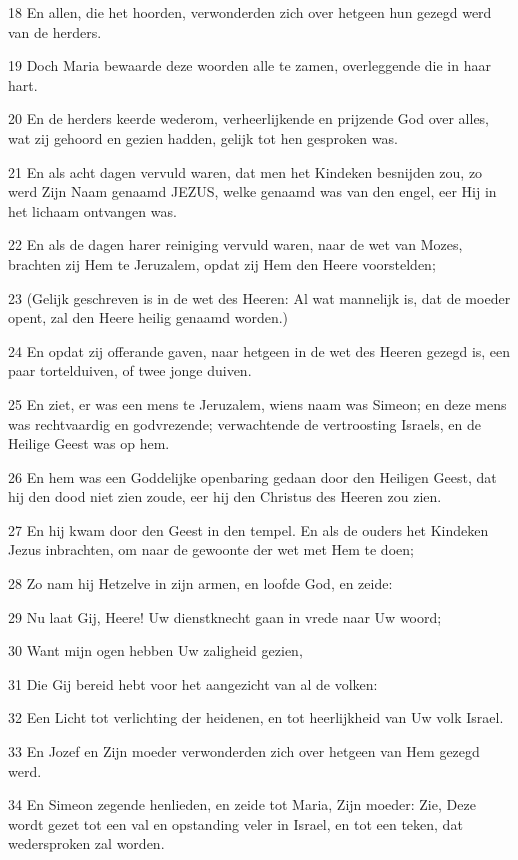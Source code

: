 \par 18 En allen, die het hoorden, verwonderden zich over hetgeen hun gezegd werd van de herders.
\par 19 Doch Maria bewaarde deze woorden alle te zamen, overleggende die in haar hart.
\par 20 En de herders keerde wederom, verheerlijkende en prijzende God over alles, wat zij gehoord en gezien hadden, gelijk tot hen gesproken was.
\par 21 En als acht dagen vervuld waren, dat men het Kindeken besnijden zou, zo werd Zijn Naam genaamd JEZUS, welke genaamd was van den engel, eer Hij in het lichaam ontvangen was.
\par 22 En als de dagen harer reiniging vervuld waren, naar de wet van Mozes, brachten zij Hem te Jeruzalem, opdat zij Hem den Heere voorstelden;
\par 23 (Gelijk geschreven is in de wet des Heeren: Al wat mannelijk is, dat de moeder opent, zal den Heere heilig genaamd worden.)
\par 24 En opdat zij offerande gaven, naar hetgeen in de wet des Heeren gezegd is, een paar tortelduiven, of twee jonge duiven.
\par 25 En ziet, er was een mens te Jeruzalem, wiens naam was Simeon; en deze mens was rechtvaardig en godvrezende; verwachtende de vertroosting Israels, en de Heilige Geest was op hem.
\par 26 En hem was een Goddelijke openbaring gedaan door den Heiligen Geest, dat hij den dood niet zien zoude, eer hij den Christus des Heeren zou zien.
\par 27 En hij kwam door den Geest in den tempel. En als de ouders het Kindeken Jezus inbrachten, om naar de gewoonte der wet met Hem te doen;
\par 28 Zo nam hij Hetzelve in zijn armen, en loofde God, en zeide:
\par 29 Nu laat Gij, Heere! Uw dienstknecht gaan in vrede naar Uw woord;
\par 30 Want mijn ogen hebben Uw zaligheid gezien,
\par 31 Die Gij bereid hebt voor het aangezicht van al de volken:
\par 32 Een Licht tot verlichting der heidenen, en tot heerlijkheid van Uw volk Israel.
\par 33 En Jozef en Zijn moeder verwonderden zich over hetgeen van Hem gezegd werd.
\par 34 En Simeon zegende henlieden, en zeide tot Maria, Zijn moeder: Zie, Deze wordt gezet tot een val en opstanding veler in Israel, en tot een teken, dat wedersproken zal worden.
